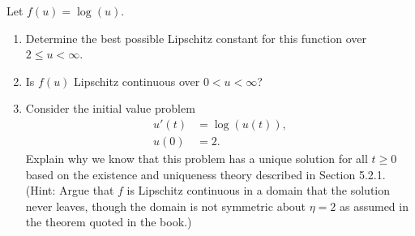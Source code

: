 

Let $f(u) = \log(u)$.
\begin{enumerate}
\item Determine the best possible Lipschitz constant for this function over
$2\leq u < \infty$.

\item Is $f(u)$ Lipschitz continuous over $0<u<\infty$?

\item Consider the initial value problem
\begin{equation*}
\begin{split}
u'(t) &= \log(u(t)),\\
u(0) &= 2.
\end{split}
\end{equation*}
Explain why we know that this problem has a unique solution for all $t\geq 0$
based on the existence and uniqueness theory described in Section 5.2.1.
(Hint: Argue that $f$ is Lipschitz continuous in  a domain that the
solution never leaves, though the domain is
not symmetric about $\eta=2$ as assumed in the theorem quoted in the book.)
\end{enumerate} 


